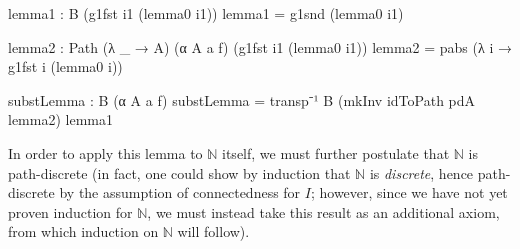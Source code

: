 \documentclass[
  12pt]{article}
\newenvironment{Shaded}{\begin{snugshade}}{\end{snugshade}}
\newcommand{\NormalTok}[1]{\textcolor[rgb]{0.12,0.11,0.11}{#1}}
\newcommand{\OtherTok}[1]{\textcolor[rgb]{0.00,0.43,0.16}{#1}}
\begin{document}
\begin{Shaded}
\begin{Highlighting}[]
\NormalTok{    lemma1 }\OtherTok{:}\NormalTok{ B }\OtherTok{(}\NormalTok{g1fst i1 }\OtherTok{(}\NormalTok{lemma0 i1}\OtherTok{))}
\NormalTok{    lemma1 }\OtherTok{=}\NormalTok{ g1snd }\OtherTok{(}\NormalTok{lemma0 i1}\OtherTok{)}

\NormalTok{    lemma2 }\OtherTok{:}\NormalTok{ Path }\OtherTok{(λ} \OtherTok{\_} \OtherTok{→}\NormalTok{ A}\OtherTok{)} \OtherTok{(}\NormalTok{α A a f}\OtherTok{)} \OtherTok{(}\NormalTok{g1fst i1 }\OtherTok{(}\NormalTok{lemma0 i1}\OtherTok{))}
\NormalTok{    lemma2 }\OtherTok{=}\NormalTok{ pabs }\OtherTok{(λ}\NormalTok{ i }\OtherTok{→}\NormalTok{ g1fst i }\OtherTok{(}\NormalTok{lemma0 i}\OtherTok{))}

\NormalTok{    substLemma }\OtherTok{:}\NormalTok{ B }\OtherTok{(}\NormalTok{α A a f}\OtherTok{)}
\NormalTok{    substLemma }\OtherTok{=}\NormalTok{ transp⁻¹ B }\OtherTok{(}\NormalTok{mkInv idToPath pdA lemma2}\OtherTok{)}\NormalTok{ lemma1}
\end{Highlighting}
\end{Shaded}

In order to apply this lemma to \(\mathbb{N}\) itself, we must further
postulate that \(\mathbb{N}\) is path-discrete (in fact, one could show
by induction that \(ℕ\) is \emph{discrete}, hence path-discrete by the
assumption of connectedness for \(I\); however, since we have not yet
proven induction for \(\mathbb{N}\), we must instead take this result as
an additional axiom, from which induction on \(\mathbb{N}\) will
follow).
\end{document}
